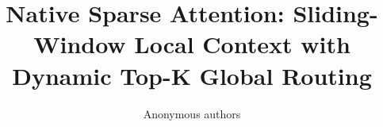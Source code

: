 \title{\textbf{Native Sparse Attention: Sliding-Window Local Context with Dynamic Top-K Global Routing}}

\author{Anonymous authors}
